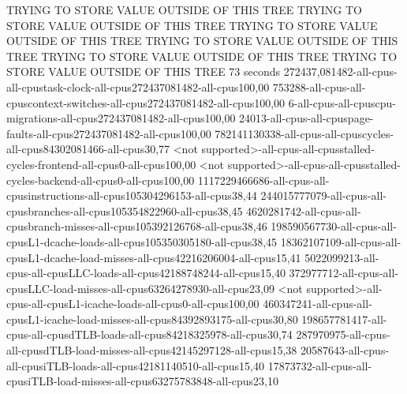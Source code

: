 TRYING TO STORE VALUE OUTSIDE OF THIS TREE
TRYING TO STORE VALUE OUTSIDE OF THIS TREE
TRYING TO STORE VALUE OUTSIDE OF THIS TREE
TRYING TO STORE VALUE OUTSIDE OF THIS TREE
TRYING TO STORE VALUE OUTSIDE OF THIS TREE
TRYING TO STORE VALUE OUTSIDE OF THIS TREE
73 seconds
272437,081482-all-cpus-all-cpustask-clock-all-cpus272437081482-all-cpus100,00
753288-all-cpus-all-cpuscontext-switches-all-cpus272437081482-all-cpus100,00
6-all-cpus-all-cpuscpu-migrations-all-cpus272437081482-all-cpus100,00
24013-all-cpus-all-cpuspage-faults-all-cpus272437081482-all-cpus100,00
782141130338-all-cpus-all-cpuscycles-all-cpus84302081466-all-cpus30,77
<not supported>-all-cpus-all-cpusstalled-cycles-frontend-all-cpus0-all-cpus100,00
<not supported>-all-cpus-all-cpusstalled-cycles-backend-all-cpus0-all-cpus100,00
1117229466686-all-cpus-all-cpusinstructions-all-cpus105304296153-all-cpus38,44
244015777079-all-cpus-all-cpusbranches-all-cpus105354822960-all-cpus38,45
4620281742-all-cpus-all-cpusbranch-misses-all-cpus105392126768-all-cpus38,46
198590567730-all-cpus-all-cpusL1-dcache-loads-all-cpus105350305180-all-cpus38,45
18362107109-all-cpus-all-cpusL1-dcache-load-misses-all-cpus42216206004-all-cpus15,41
5022099213-all-cpus-all-cpusLLC-loads-all-cpus42188748244-all-cpus15,40
372977712-all-cpus-all-cpusLLC-load-misses-all-cpus63264278930-all-cpus23,09
<not supported>-all-cpus-all-cpusL1-icache-loads-all-cpus0-all-cpus100,00
460347241-all-cpus-all-cpusL1-icache-load-misses-all-cpus84392893175-all-cpus30,80
198657781417-all-cpus-all-cpusdTLB-loads-all-cpus84218325978-all-cpus30,74
287970975-all-cpus-all-cpusdTLB-load-misses-all-cpus42145297128-all-cpus15,38
20587643-all-cpus-all-cpusiTLB-loads-all-cpus42181140510-all-cpus15,40
17873732-all-cpus-all-cpusiTLB-load-misses-all-cpus63275783848-all-cpus23,10
